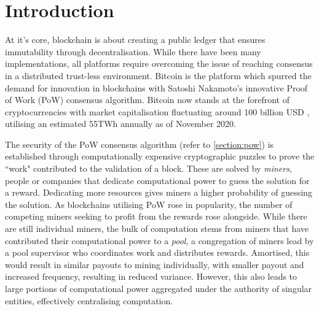 \chapter{Introduction}


At it's core, blockchain is about creating a public ledger that ensures immutability through decentralisation. While there have been many implementations, all platforms require overcoming the issue of reaching consensus in a distributed trust-less environment. Bitcoin \cite{nakamoto2009} is the platform which spurred the demand for innovation in blockchains with Satoshi Nakamoto's innovative Proof of Work (PoW) consensus algorithm. Bitcoin now stands at the forefront of cryptocurrencies with market capitalisation fluctuating around 100 billion USD \cite{bitcoinmarketcap2020}, utilising an estimated 55TWh annually \cite{cambridge2020} as of November 2020.

The security of the PoW consensus algorithm (refer to \cref{section:pow}) is established through computationally expensive cryptographic puzzles to prove the ``work" contributed to the validation of a block. These are solved by \textit{miners}, people or companies that dedicate computational power to guess the solution for a reward. Dedicating more resources gives miners a higher probability of guessing the solution. As blockchains utilising PoW rose in popularity, the number of competing miners seeking to profit from the rewards rose alongside. While there are still individual miners, the bulk of computation stems from miners that have contributed their computational power to a \textit{pool}, a congregation of miners lead by a pool supervisor who coordinates work and distributes rewards. Amortised, this would result in similar payouts to mining individually, with smaller payout and increased frequency, resulting in reduced variance. However, this also leads to large portions of computational power aggregated under the authority of singular entities, effectively centralising computation.

